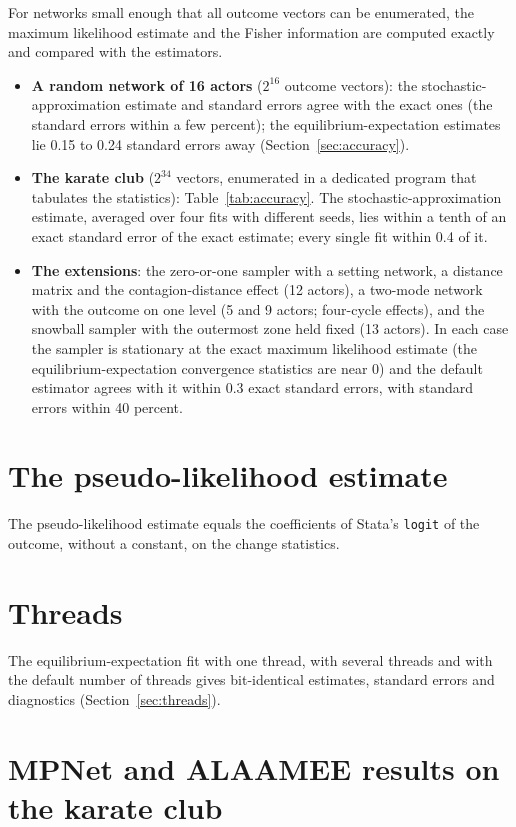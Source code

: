 For networks small enough that all outcome vectors can be enumerated, the maximum likelihood estimate and the Fisher information are computed exactly and compared with the estimators.
\begin{itemize}[nosep]
  \item \textbf{A random network of 16 actors} ($2^{16}$ outcome vectors): the stochastic-approximation estimate and standard errors agree with the exact ones (the standard errors within a few percent); the equilibrium-expectation estimates lie 0.15 to 0.24 standard errors away (Section~\ref{sec:accuracy}).
  \item \textbf{The karate club} ($2^{34}$ vectors, enumerated in a dedicated program that tabulates the statistics): Table~\ref{tab:accuracy}. The stochastic-approximation estimate, averaged over four fits with different seeds, lies within a tenth of an exact standard error of the exact estimate; every single fit within 0.4 of it.
  \item \textbf{The extensions}: the zero-or-one sampler with a setting network, a distance matrix and the contagion-distance effect (12 actors), a two-mode network with the outcome on one level (5 and 9 actors; four-cycle effects), and the snowball sampler with the outermost zone held fixed (13 actors). In each case the sampler is stationary at the exact maximum likelihood estimate (the equilibrium-expectation convergence statistics are near 0) and the default estimator agrees with it within 0.3 exact standard errors, with standard errors within 40 percent.
\end{itemize}

\section{The pseudo-likelihood estimate}

The pseudo-likelihood estimate equals the coefficients of Stata's \texttt{logit} of the outcome, without a constant, on the change statistics.

\section{Threads}

The equilibrium-expectation fit with one thread, with several threads and with the default number of threads gives bit-identical estimates, standard errors and diagnostics (Section~\ref{sec:threads}).

\section{MPNet and ALAAMEE results on the karate club}

